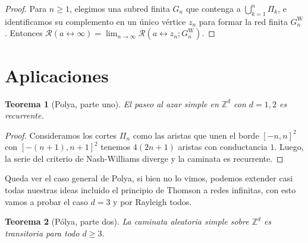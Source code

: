 \documentclass[11pt,a4paper]{article}
\newcommand{\Z}{\mathbb{Z}}
\numberwithin{equation}{section}
\theoremstyle{LPplain}
\newtheorem{teo}{Teorema}[section]
\theoremstyle{LPdef}
\theoremstyle{LPrem}
\begin{document}
\begin{proof}
  Para $n \ge 1$, elegimos una subred finita $G_n$ que contenga a
  $\bigcup_{k=1}^{n} \Pi_k$, e identificamos su complemento en un único vértice $z_n$ para formar la red finita
  $G_n^{\mathrm{W}}$. Entonces
  $\mathscr{R}(a \leftrightarrow \infty)
  = \lim_{n \to \infty} \mathcal{R}(a \leftrightarrow z_n; G_n^{\mathrm{W}})$.
\end{proof}

\section{Aplicaciones}

\begin{teo}[Polya, parte uno] 
  El paseo al azar simple en $\Z^d$ con $d=1,2$ es recurrente.
\end{teo}

\begin{proof}
  Consideramos los cortes $\Pi_n$ como las aristas que unen el borde $[-n , n]^{2}$ con $[-(n+1), n+1]^2$
  tenemos $4(2n+1)$ aristas con conductancia $1$. Luego, la serie del criterio de Nash-Williams diverge y la caminata es recurrente. 
\end{proof}

Queda ver el caso general de Polya, si bien no lo vimos, podemos extender casi todas nuestras ideas 
incluido el principio de Thomson a redes infinitas, con esto vamos a probar el caso $d=3$ y
por Rayleigh todos.

\begin{teo}[Pólya, parte dos]\label{thm:polya-transient}
  La caminata aleatoria simple sobre 
  $\mathbb{Z}^d$ es transitoria para todo $d \ge 3$.
\end{teo}
\end{document}
